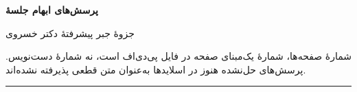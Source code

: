\documentclass[a4paper,12pt]{article}
\newcommand{\qtitle}[2]{{\Large\bfseries\color{ink} پرسش \lr{#1}: #2}\par}
\newcommand{\answer}{\medskip\textbf{پاسخ یا صورت مورد تأیید و تاریخ:}\par\vspace{18mm}\hrule\medskip}
\begin{document}
{\LARGE\bfseries پرسش‌های ابهام جلسهٔ }\par
{\large جزوهٔ جبر پیشرفتهٔ دکتر خسروی}\par
شمارهٔ صفحه‌ها، شمارهٔ یک‌مبنای صفحه در فایل پی‌دی‌اف است، نه شمارهٔ دست‌نویس.
پرسش‌های حل‌نشده هنوز در اسلایدها به‌عنوان متن قطعی پذیرفته نشده‌اند.
\medskip\hrule\medskip

\end{document}
